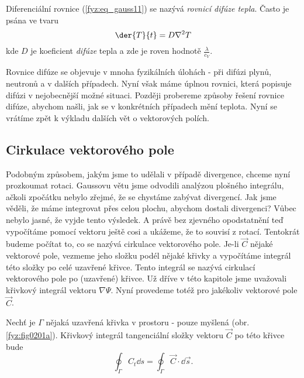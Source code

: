         Diferenciální rovnice (\ref{fyz:eq_gauss11}) se nazývá \emph{rovnicí difúze tepla}. Často je 
        psána ve tvaru
        \begin{equation}\label{fyz:eq_gauss12}
          \der{T}{t} = D\nabla^2T
        \end{equation}
        kde \(D\) je koeficient \emph{difúze} tepla a zde je roven hodnotě
        \(\displaystyle\frac{\lambda}{c_V}\).
        
        Rovnice difúze se objevuje v mnoha fyzikálních úlohách - při difúzi plynů, neutronů a v
        dalších případech. Nyní však máme úplnou rovnici, která popisuje difúzi v nejobecnější možné
        situaci. Později probereme způsoby řešení rovnice difúze, abychom našli, jak se v
        konkrétních případech mění teplota. Nyní se vrátíme zpět k výkladu dalších vět o vektorových
        polích.
  
    \subsection{Cirkulace vektorového pole}\label{fyz:IIchapIIIsecIV}

      Podobným způsobem, jakým jsme to udělali v případě divergence, chceme nyní prozkoumat rotaci. 
      Gaussovu větu jsme odvodili analýzou plošného integrálu, ačkoli zpočátku nebylo zřejmé, že se 
      chystáme zabývat divergencí. Jak jsme věděli, že máme integrovat přes celou plochu, abychom 
      dostali divergenci? Vůbec nebylo jasné, že vyjde tento výsledek. A právě bez zjevného  
      opodstatnění teď vypočítáme pomocí vektoru ještě cosi a ukážeme, že to souvisí z rotací. 
      Tentokrát budeme počítat to, co se nazývá cirkulace vektorového pole. Je-li \(\vec{C}\) nějaké 
      vektorové pole, vezmeme jeho složku podél nějaké křivky a vypočítáme integrál této složky po 
      celé uzavřené křivce. Tento integrál se nazývá cirkulací vektorového pole po (uzavřené) křivce. 
      Už dříve v této kapitole jsme uvažovali křivkový integrál vektoru \(\nabla\Psi\). Nyní 
      provedeme totéž pro jakékoliv vektorové pole \(\vec{C}\).
      
      Nechť je \(\Gamma\) nějaká uzavřená křivka v prostoru - pouze myšlená (obr. \ref{fyz:fig0201a}). 
      Křivkový integrál tangenciální složky vektoru \(\vec{C}\) po této křivce bude
      \begin{equation}\label{fyz:eq_fey_circ1}
        \oint_\Gamma C_t\dd{s} = \oint_\Gamma\vec{C}\cdot\dd{\vec{s}}.
      \end{equation}    
      
